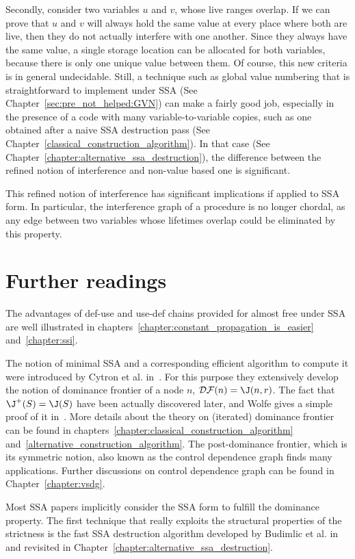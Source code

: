 Secondly, consider two variables $u$ and $v$, whose live ranges overlap.
If we can prove that $u$ and $v$ will always hold the same value
at every place where both are live, then they do not actually interfere
with one another. Since they always have the same value, a single 
storage location can be allocated for both variables, because there
is only one unique value between them. 
Of course, this new criteria is in general undecidable.
Still, a technique such as global value numbering that is straightforward to implement under SSA (See Chapter~\ref{sec:pre_not_helped:GVN}) can make a fairly good job, especially in the presence of a code with many variable-to-variable copies, such as one obtained after a naive 
SSA destruction pass (See Chapter~\ref{classical_construction_algorithm}).
In that case (See Chapter~\ref{chapter:alternative_ssa_destruction}), the difference between the refined notion of interference and non-value based one is significant. 

This refined notion of interference has significant implications if
applied to SSA form. In particular, the interference graph of a procedure
is no longer chordal, as any edge between two variables whose lifetimes
overlap could be eliminated by this property. 


\section{Further readings}
The advantages of def-use and use-def chains provided for almost free under SSA are well illustrated in chapters~\ref{chapter:constant_propagation_is_easier} and~\ref{chapter:ssi}.

The notion of minimal SSA and a corresponding efficient algorithm to compute it were introduced by Cytron et al. in~\cite{CytronOct91}. For this purpose they extensively develop the notion of dominance frontier of a node $n$, ${\cal DF}(n)=\J(n,r)$. The fact that $\J^+(S)=\J(S)$ have been actually discovered later, and Wolfe gives a simple proof of it in~\cite{WolfeJul94}. More details about the theory on (iterated) dominance frontier can be found in chapters~\ref{chapter:classical_construction_algorithm} and~\ref{alternative_construction_algorithm}. The post-dominance frontier, which is its symmetric notion, also known as the control dependence graph finds many applications. Further discussions on control dependence graph can be found in Chapter~\ref{chapter:vsdg}. 

Most SSA papers implicitly consider the SSA form to fulfill the dominance property. The first technique that really exploits the structural properties of the strictness is the fast SSA destruction algorithm developed by Budimlic et al. in~\cite{BudimlicJun02} and revisited in Chapter~\ref{chapter:alternative_ssa_destruction}. 

